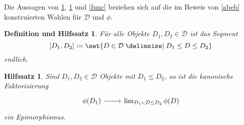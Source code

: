 \documentclass[a4paper, parskip=half]{scrartcl}
\theoremstyle{marginbreak}
\newtheorem{lemma}[remark]{Hilfssatz}
\newtheorem{defle}[remark]{Definition und Hilfssatz}
\theoremstyle{nonumberplain}
\newtheorem{proof}{Beweis.}
\newcommand\cat\mathcal
\newcommand{\p}[1]{\iftoggle{proofs}{#1}{}}
\begin{document}
		Die Aussagen von \ref{fin}, \ref{fact} und \ref{func} beziehen sich auf
		die im Beweis von \ref{abeb} konstruierten
		Wahlen für $\cat{D}$ und $\phi$.
		\begin{defle}\label{fin}
			Für alle Objekte $D_1,D_2\in\cat{D}$ ist das Segment
				\[
					[D_1, D_2] \coloneqq\set{D\in\cat{D}\given D_1\leq D\leq D_2}
				\]
			endlich.
		\end{defle}
		\p{\begin{proof}
			Wir spielen die beiden verschachtelten Induktionen noch einmal durch und
			zeigen für zwei Elemente $D_1, D_2$, die an einer Stelle der Konstruktion
			zusammen auftauchen:
			\begin{enumerate}[label=(\arabic*),noitemsep]
				\item $[D_1, D_2]$ ist endlich,
				\item $[D_1, D_2]$ wird sich in keinem weiteren Schritt noch
					verändern.
			\end{enumerate}
			$\cat{D}_0 = \set{*}$ erfüllt (1). Falls $\cat{D}_n^\alpha$ die Bedingungen
			erfüllt, betrachte $D_1, D_2$ in $\cat{D}_n^{\alpha+1}$. Die Konstruktion
			von $\cat{D}_n^{\alpha+1}$ stellt sicher, dass $D'\leq D^*$ für ein Element
			$D'$ in $\cat{D}_n^\alpha$ und ein Element $D^*$, das in $\cat{D}_n^\alpha$
			neu dazukommt, nicht vorkommen kann.

			Es seien $D_1, D_2\in\cat{D}_n^{\alpha+1}$, $D_1\leq D_2$.
			Falls $D_1, D_2\in\cat{D}_n^\alpha$,
			so ist $[D_1, D_2]$ in $\cat{D}_n^{\alpha+1}$ unverändert gegenüber
			$\cat{D}_n^{\alpha}$. Falls $D_1, D_2\notin\cat{D}_n^{\alpha}$,
			dann existieren $D, D'\in\cat{D}_n^\alpha$ mit $D_1=D^*, D_2=D'^*$.
			$[D_1,D_2]$ in $\cat{D}_n^{\alpha+1}$ ist dann isomorph zu $[D, D']$
			in $\cat{D}_n^\alpha$, also nach Voraussetzung endlich.
			Falls $D_1\notin\cat{D}_n^\alpha$, $D_2\in\cat{D}_n^\alpha$, dann ist
			$D_1=D^*$ und $[D_1, D_2] = [D^*, D_2^*]\cup[D, D_2]$, also endlich.
			$D_1\in\cat{D}_n^\alpha$, $D_2\notin\cat{D}_n^\alpha$ kann nicht eintreten.

			Da die Bedingungen bei jedem Successor-Ordinal erhalten bleiben, bleiben
			sie auch bei einem Limit-Ordinal erhalten (der Limit-Schritt fügt ja gar
			keine Objekte hinzu).
		\end{proof}}
		\begin{lemma}\label{fact}
			Sind $D_1, D_2\in\cat{D}$ Objekte mit $D_1\leq D_2$, so ist die kanonische Faktorisierung
			\[
				\begin{tikzcd}
					\phi(D_1) \arrow[r] & \lim_{D_1<D\leq D_2}\phi(D)
				\end{tikzcd}
			\]
			ein Epimorphismus.
		\end{lemma}
\end{document}
